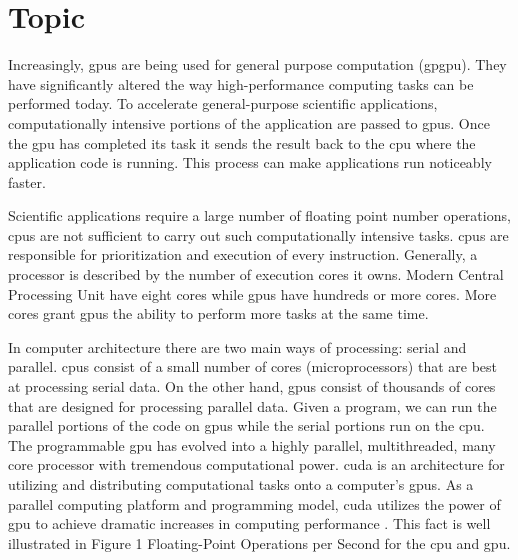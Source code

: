\section{Topic}

Increasingly, \Glspl{gpu} are being used for general purpose computation
(\gls{gpgpu}). They have significantly altered the way high-performance
computing tasks can be performed today. To accelerate general-purpose
scientific applications, computationally intensive portions of the application
are passed to \glspl{gpu}. Once the \gls{gpu} has completed its task it sends
the result back to the \Gls{cpu} where the application code is running. This
process can make applications run noticeably faster.

Scientific applications require a large number of floating point number
operations, \Glspl{cpu} are not sufficient to carry out such computationally
intensive tasks. \glspl{cpu} are responsible for prioritization and execution
of every instruction. Generally, a processor is described by the number of
execution cores it owns. Modern Central Processing Unit have eight cores while
\Glspl{gpu} have hundreds or more cores. More cores grant \glspl{gpu} the
ability to perform more tasks at the same time.

In computer architecture there are two main ways of processing: serial and
parallel. \Glspl{cpu} consist of a small number of cores (microprocessors) that
are best at processing serial data. On the other hand, \glspl{gpu} consist of
thousands of cores that are designed for processing parallel data. Given a
program, we can run the parallel portions of the code on \glspl{gpu} while the
serial portions run on the \gls{cpu}\@. The programmable \gls{gpu} has evolved
into a highly parallel, multithreaded, many core processor with tremendous
computational power. \Gls{cuda} is an architecture for utilizing and
distributing computational tasks onto a computer's \glspl{gpu}. As a parallel
computing platform and programming model, \gls{cuda} utilizes the power of
\gls{gpu} to achieve dramatic increases in computing performance
\cite{website:cudaCProgrammingGuide}. This fact is well illustrated in
Figure 1 Floating-Point Operations per Second for the \gls{cpu} and
\gls{gpu}.\\

